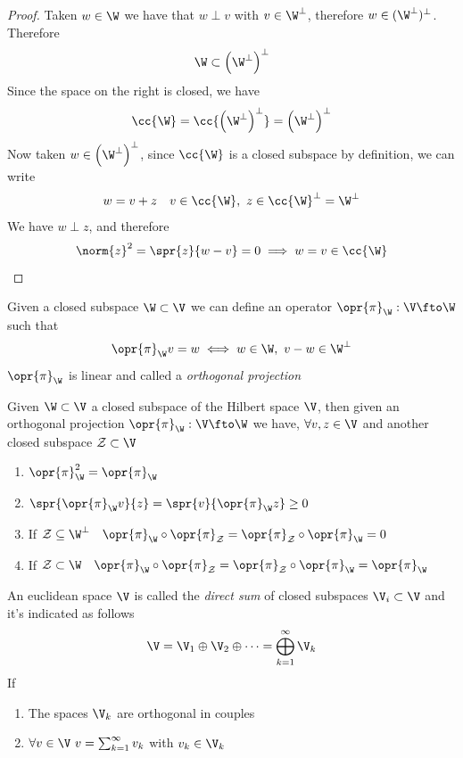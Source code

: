 \documentclass[../mmf.tex]{subfiles}
\begin{document}
\begin{proof}
	Taken $w\in\W$ we have that $w\perp v$ with $v\in\W^\perp$, therefore $w\in(\W^\perp)^\perp$. Therefore
	\begin{equation*}
		\W\subset\left( \W^\perp \right)^\perp
	\end{equation*}
	Since the space on the right is closed, we have
	\begin{equation*}
		\cc{\W}=\cc{\left( \W^\perp \right)^\perp}=\left( \W^\perp \right)^\perp
	\end{equation*}
	Now taken $w\in\left( \W^\perp \right)^\perp$, since $\cc{\W}$ is a closed subspace by definition, we can write
	\begin{equation*}
		w=v+z\quad v\in\cc{\W},\ z\in\cc{\W}^\perp=\W^\perp
	\end{equation*}
	We have $w\perp z$, and therefore
	\begin{equation*}
		\norm{z}^2=\spr{z}{w-v}=0\implies w=v\in\cc{\W}
	\end{equation*}
\end{proof}
\begin{dfn}
	Given a closed subspace $\W\subset\V$ we can define an operator $\opr{\pi}_\W:\V\fto\W$ such that
	\begin{equation}
		\opr{\pi}_\W v=w\iff w\in\W,\ v-w\in\W^\perp
		\label{eq:orthprojection}
	\end{equation}
	$\opr{\pi}_\W$ is linear and called a \textit{orthogonal projection}
\end{dfn}
\begin{thm}
	Given $\W\subset\V$ a closed subspace of the Hilbert space $\V$, then given an orthogonal projection $\opr{\pi}_\W:\V\fto\W$ we have, $\forall v,z\in\V$ and another closed subspace $\mathcal{Z}\subset\V$
	\begin{enumerate}
	\item $\opr{\pi}_\W^2=\opr{\pi}_\W$
	\item $\spr{\opr{\pi}_\W v}{z}=\spr{v}{\opr{\pi}_\W z}\ge0$
	\item If $\mathcal{Z}\subseteq\W^\perp\quad\opr{\pi}_\W\circ\opr{\pi}_{\mathcal{Z}}=\opr{\pi}_{\mathcal{Z}}\circ\opr{\pi}_\W=0$
	\item If $\mathcal{Z}\subset\W\quad\opr{\pi}_\W\circ\opr{\pi}_{\mathcal{Z}}=\opr{\pi}_{\mathcal{Z}}\circ\opr{\pi}_\W=\opr{\pi}_\W$
	\end{enumerate}
\end{thm}
\begin{dfn}
	An euclidean space $\V$ is called the \textit{direct sum} of closed subspaces $\V_i\subset\V$ and it's indicated as follows
	\begin{equation}
		\V=\V_1\oplus\V_2\oplus\cdots=\bigoplus_{k=1}^\infty\V_k
		\label{eq:directsum}
	\end{equation}
	If
	\begin{enumerate}
	\item The spaces $\V_k$ are orthogonal in couples
	\item $\forall v\in\V\ v=\sum_{k=1}^\infty v_k$ with $v_k\in\V_k$
	\end{enumerate}
\end{dfn}
\end{document}

